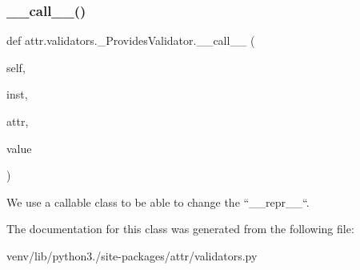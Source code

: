 \subsubsection{\texorpdfstring{\+\_\+\+\_\+call\+\_\+\+\_\+()}{\_\_call\_\_()}}
{\footnotesize\ttfamily def attr.\+validators.\+\_\+\+Provides\+Validator.\+\_\+\+\_\+call\+\_\+\+\_\+ (\begin{DoxyParamCaption}\item[{}]{self,  }\item[{}]{inst,  }\item[{}]{attr,  }\item[{}]{value }\end{DoxyParamCaption})}

\begin{DoxyVerb}We use a callable class to be able to change the ``__repr__``.
\end{DoxyVerb}
 

The documentation for this class was generated from the following file\+:\begin{DoxyCompactItemize}
\item 
venv/lib/python3./site-\/packages/attr/validators.\+py\end{DoxyCompactItemize}
